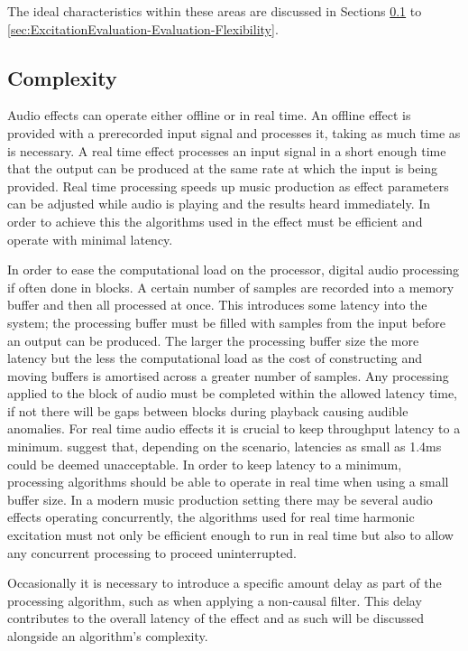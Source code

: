 	The ideal characteristics within these areas are discussed in Sections
	\ref{sec:ExcitationEvaluation-Evaluation-Complexity} to \ref{sec:ExcitationEvaluation-Evaluation-Flexibility}.

	\subsection{Complexity}
	\label{sec:ExcitationEvaluation-Evaluation-Complexity}
		Audio effects can operate either offline or in real time. An offline effect is provided with a prerecorded
		input signal and processes it, taking as much time as is necessary. A real time effect processes an input
		signal in a short enough time that the output can be produced at the same rate at which the input is being
		provided. Real time processing speeds up music production as effect parameters can be adjusted while audio
		is playing and the results heard immediately. In order to achieve this the algorithms used in the effect
		must be efficient and operate with minimal latency. 

		In order to ease the computational load on the processor, digital audio processing if often done in blocks.
		A certain number of samples are recorded into a memory buffer and then all processed at once. This
		introduces some latency into the system; the processing buffer must be filled with samples from the input
		before an output can be produced. The larger the processing buffer size the more latency but the less the
		computational load as the cost of constructing and moving buffers is amortised across a greater number of
		samples. Any processing applied to the block of audio must be completed within the allowed latency time, if
		not there will be gaps between blocks during playback causing audible anomalies. For real time audio
		effects it is crucial to keep throughput latency to a minimum. \citet{lester2007the} suggest that,
		depending on the scenario, latencies as small as 1.4ms could be deemed unacceptable. In order to keep
		latency to a minimum, processing algorithms should be able to operate in real time when using a small
		buffer size. In a modern music production setting there may be several audio effects operating
		concurrently, the algorithms used for real time harmonic excitation must not only be efficient enough to
		run in real time but also to allow any concurrent processing to proceed uninterrupted.

		Occasionally it is necessary to introduce a specific amount delay as part of the processing algorithm, such
		as when applying a non-causal filter. This delay contributes to the overall latency of the effect and as
		such will be discussed alongside an algorithm's complexity.

